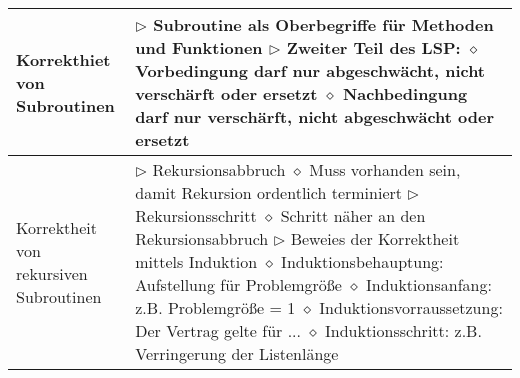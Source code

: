 \begin{table}[H]
\begin{tabular}{ | p{4cm} p{13.5cm} | }
	\makecell[l]{Korrekthiet von \\ Subroutinen} & 
	\makecell[l]
	{
	$\rhd$ Subroutine als Oberbegriffe für Methoden und Funktionen \\
	$\rhd$ Zweiter Teil des LSP: \\
	\hspace{0.4cm} $\diamond$ Vorbedingung darf nur abgeschwächt, nicht verschärft oder ersetzt \\
	\hspace{0.4cm} $\diamond$ Nachbedingung darf nur verschärft, nicht abgeschwächt oder ersetzt \\
	} 	\\ \hline


	\makecell[l]{Korrektheit von \\ rekursiven Subroutinen} & 
	\makecell[l]
	{
	$\rhd$ Rekursionsabbruch \\
	\hspace{0.4cm} $\diamond$ Muss vorhanden sein, damit Rekursion ordentlich terminiert \\
	$\rhd$ Rekursionsschritt \\
	\hspace{0.4cm} $\diamond$ Schritt näher an den Rekursionsabbruch \\
	$\rhd$ Beweies der Korrektheit mittels Induktion \\
	\hspace{0.4cm} $\diamond$ Induktionsbehauptung: Aufstellung für Problemgrö\ss e \\
	\hspace{0.4cm} $\diamond$ Induktionsanfang: z.B. Problemgrö\ss e = 1 \\
	\hspace{0.4cm} $\diamond$ Induktionsvorraussetzung: Der Vertrag gelte für ... \\
	\hspace{0.4cm} $\diamond$ Induktionsschritt: z.B. Verringerung der Listenlänge \\
	} 	\\ \hline



\end{tabular}
\end{table}
